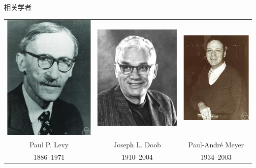 \documentclass[t]{beamer}
\begin{document}
    \begin{frame}{相关学者}
    \centering
    \begin{tabular}{ccc}
    \includegraphics[height=.5\textheight]{fig/levy.jpg}&\includegraphics[height=.5\textheight]{fig/Doob.jpeg}&\includegraphics[height=.5\textheight]{fig/meyer.jpg}\\
    Paul P. Levy&Joseph L. Doob&Paul-Andr\'{e} Meyer\\
    1886--1971&1910--2004& 1934--2003\\
    \end{tabular}
    
    \end{frame}
    
\end{document}
